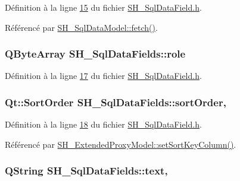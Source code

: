 Définition à la ligne \hyperlink{SH__SqlDataField_8h_source_l00015}{15} du fichier \hyperlink{SH__SqlDataField_8h_source}{S\-H\-\_\-\-Sql\-Data\-Field.\-h}.



Référencé par \hyperlink{classSH__SqlDataModel_a8d9b08d282a304945b9ee2f474020980}{S\-H\-\_\-\-Sql\-Data\-Model\-::fetch()}.

\hypertarget{classSH__SqlDataFields_a7ec3ef0a355a12b9adab707d508bfa94}{
\subsubsection[{role}]{\setlength{\rightskip}{0pt plus 5cm}Q\-Byte\-Array S\-H\-\_\-\-Sql\-Data\-Fields\-::role\hspace{0.3cm}{\ttfamily [read]}}}\label{classSH__SqlDataFields_a7ec3ef0a355a12b9adab707d508bfa94}


Définition à la ligne \hyperlink{SH__SqlDataField_8h_source_l00017}{17} du fichier \hyperlink{SH__SqlDataField_8h_source}{S\-H\-\_\-\-Sql\-Data\-Field.\-h}.

\hypertarget{classSH__SqlDataFields_aec4483df7b9edfe22100985047d97bdd}{
\subsubsection[{sort\-Order}]{\setlength{\rightskip}{0pt plus 5cm}Qt\-::\-Sort\-Order S\-H\-\_\-\-Sql\-Data\-Fields\-::sort\-Order\hspace{0.3cm}{\ttfamily [read]}, {\ttfamily [write]}}}\label{classSH__SqlDataFields_aec4483df7b9edfe22100985047d97bdd}


Définition à la ligne \hyperlink{SH__SqlDataField_8h_source_l00018}{18} du fichier \hyperlink{SH__SqlDataField_8h_source}{S\-H\-\_\-\-Sql\-Data\-Field.\-h}.



Référencé par \hyperlink{classSH__ExtendedProxyModel_ad1eb97a28d23e9aba8174bd5ffd7a5e4}{S\-H\-\_\-\-Extended\-Proxy\-Model\-::set\-Sort\-Key\-Column()}.

\hypertarget{classSH__SqlDataFields_a30fa26427d0ee5476fd59813390f99b9}{
\subsubsection[{text}]{\setlength{\rightskip}{0pt plus 5cm}Q\-String S\-H\-\_\-\-Sql\-Data\-Fields\-::text\hspace{0.3cm}{\ttfamily [read]}, {\ttfamily [write]}}}\label{classSH__SqlDataFields_a30fa26427d0ee5476fd59813390f99b9}


